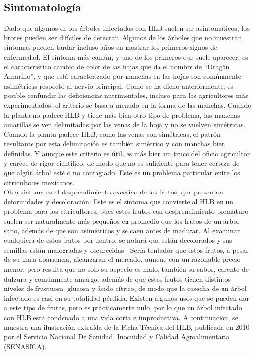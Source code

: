 \subsection{Sintomatología}
Dado que algunos de los árboles infectados con HLB suelen ser asintomáticos, los brotes pueden ser difíciles de detectar. Algunos de los árboles que no muestran síntomas pueden tardar incluso años en mostrar los primeros signos de enfermedad. El síntoma más común, y uno de los primeros que suele aparecer, es el característico cambio de color de las hojas que da el nombre de “Dragón Amarillo”, y que está caracterizado por manchas en las hojas son comúnmente asimétricas respecto al nervio principal\cite{mora2012huanglongbing}. Como se ha dicho anteriormente, es posible confundir las deficiencias nutrimentales, incluso para los agricultores más experimentados; el criterio se basa a menudo en la forma de las manchas. Cuando la planta no padece HLB y tiene más bien otro tipo de problema, las manchas amarillas se ven delimitadas por las venas de la hoja y no se vuelven simétricas. Cuando la planta padece HLB,  como las venas son simétricas, el patrón resultante por esta delimitación es también simétrico y con manchas bien definidas. Y aunque este criterio es útil, es más bien un truco del oficio agricultor y carece de rigor científico, de modo que no es suficiente para tener certeza de que algún árbol esté o no contagiado. Este es un problema particular entre los citricultores mexicanos.\\
Otro síntoma es el desprendimiento excesivo de los frutos, que presentan deformidades y decoloración. Este es el síntoma que convierte al HLB en un problema para los citricultores, pues estos frutos con desprendimiento prematuro suelen ser naturalmente más pequeños en promedio que los frutos de un árbol sano, además de que son asimétricos y se caen antes de madurar. Al examinar cualquiera de estos frutos por dentro, se notará que están decolorados y sus semillas están malogradas y oscurecidas \cite{gottwald2007citrus}.  Sería tentador que estos frutos, a pesar de su mala apariencia, alcanzaran el mercado, aunque con un razonable precio menor; pero resulta que no solo su aspecto es malo, también su sabor, carente de dulzura y comúnmente amargo, además de que estos frutos tienen distintos niveles de fructuosa, glucosa y ácido cítrico, de modo que la cosecha de un árbol infectado es casi en su totalidad pérdida. Existen algunos usos que se pueden dar a este tipo de frutas, pero es prácticamente nulo, por lo que un árbol infectado con HLB está condenado a una vida corta e improductiva.\cite{dala2019effect}
A continuación, se muestra una ilustración extraída de la Ficha Técnica del HLB, publicada en 2010 por el Servicio Nacional De Sanidad, Inocuidad y Calidad Agroalimentaria (SENASICA).

